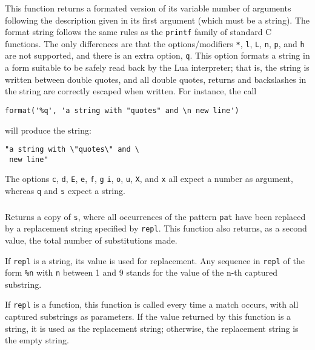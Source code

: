 \subsubsection*{}
\label{format}
This function returns a formated version of its variable number of arguments
following the description given in its first argument (which must be a string). 
The format string follows the same rules as the \verb'printf' family of
standard C functions.
The only differences are that the options/modifiers
\verb'*', \verb'l', \verb'L', \verb'n', \verb'p',
and \verb'h' are not supported,
and there is an extra option, \verb'q'.
This option formats a string in a form suitable to be safely read
back by the Lua interpreter;
that is,
the string is written between double quotes,
and all double quotes, returns and backslashes in the string
are correctly escaped when written.
For instance, the call
\begin{verbatim}
format('%q', 'a string with "quotes" and \n new line')
\end{verbatim}
will produce the string:
\begin{verbatim}
"a string with \"quotes\" and \
 new line"
\end{verbatim}

The options \verb'c', \verb'd', \verb'E', \verb'e', \verb'f',
\verb'g' \verb'i', \verb'o', \verb'u', \verb'X', and \verb'x' all
expect a number as argument,
whereas \verb'q' and \verb's' expect a string.

\subsubsection*{}
Returns a copy of \verb-s-,
where all occurrences of the pattern \verb-pat- have been
replaced by a replacement string specified by \verb-repl-.
This function also returns, as a second value,
the total number of substitutions made.

If \verb-repl- is a string, its value is used for replacement.
Any sequence in \verb-repl- of the form \verb-%n-
with \verb-n- between 1 and 9
stands for the value of the n-th captured substring.

If \verb-repl- is a function, this function is called every time a
match occurs, with all captured substrings as parameters.
If the value returned by this function is a string,
it is used as the replacement string;
otherwise, the replacement string is the empty string.

